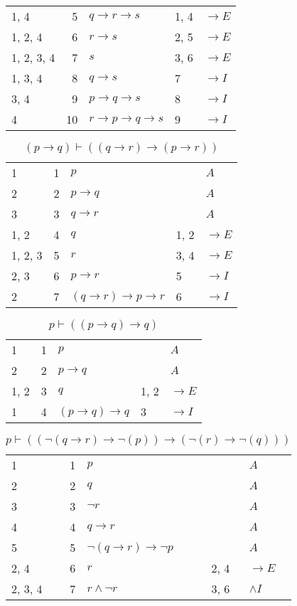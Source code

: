 \documentclass{article}
\begin{document}
\begin{table}[htbp]
\begin{tabular}{lrlll}
{1, 4} & 5 & $q→r→s$ & {1, 4} & $→E$ \\
{1, 2, 4} & 6 & $r→s$ & {2, 5} & $→E$ \\
{1, 2, 3, 4} & 7 & $s$ & {3, 6} & $→E$ \\
{1, 3, 4} & 8 & $q→s$ & {7} & $→I$ \\
{3, 4} & 9 & $p→q→s$ & {8} & $→I$ \\
{4} & 10 & $r→p→q→s$ & {9} & $→I$ \\
\end{tabular}
\end{table}\begin{table}[htbp]\caption*{$(p → q) ⊢ ((q → r) → (p → r))$}\centering\begin{tabular}{lrlll}
{1} & 1 & $p$ & {} & $A$ \\
{2} & 2 & $p→q$ & {} & $A$ \\
{3} & 3 & $q→r$ & {} & $A$ \\
{1, 2} & 4 & $q$ & {1, 2} & $→E$ \\
{1, 2, 3} & 5 & $r$ & {3, 4} & $→E$ \\
{2, 3} & 6 & $p→r$ & {5} & $→I$ \\
{2} & 7 & $(q→r)→p→r$ & {6} & $→I$ \\
\end{tabular}
\end{table}\begin{table}[htbp]\caption*{$p ⊢ ((p → q) → q)$}\centering\begin{tabular}{lrlll}
{1} & 1 & $p$ & {} & $A$ \\
{2} & 2 & $p→q$ & {} & $A$ \\
{1, 2} & 3 & $q$ & {1, 2} & $→E$ \\
{1} & 4 & $(p→q)→q$ & {3} & $→I$ \\
\end{tabular}
\end{table}\begin{table}[htbp]\caption*{$p ⊢ ((¬(q→r)→ ¬(p))→ (¬(r)→ ¬(q)))$}\centering\begin{tabular}{lrlll}
{1} & 1 & $p$ & {} & $A$ \\
{2} & 2 & $q$ & {} & $A$ \\
{3} & 3 & $¬r$ & {} & $A$ \\
{4} & 4 & $q→r$ & {} & $A$ \\
{5} & 5 & $¬ (q→r)→ ¬p$ & {} & $A$ \\
{2, 4} & 6 & $r$ & {2, 4} & $→E$ \\
{2, 3, 4} & 7 & $r∧ ¬r$ & {3, 6} & $∧I$ \\

\end{tabular}
\end{table}
\end{document}
